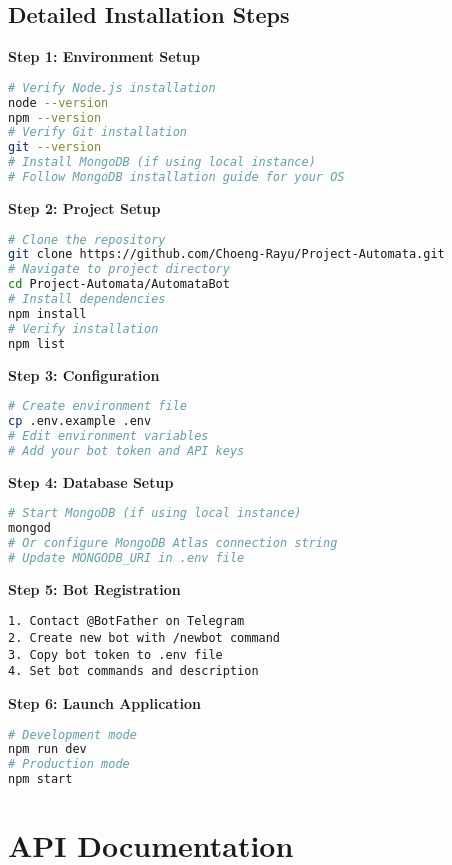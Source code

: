 \documentclass[12pt]{article}
\begin{document}
\subsection{Detailed Installation Steps}
\textbf{Step 1: Environment Setup}
\begin{lstlisting}[language=bash]
# Verify Node.js installation
node --version
npm --version
# Verify Git installation
git --version
# Install MongoDB (if using local instance)
# Follow MongoDB installation guide for your OS
\end{lstlisting}
\textbf{Step 2: Project Setup}
\begin{lstlisting}[language=bash]
# Clone the repository
git clone https://github.com/Choeng-Rayu/Project-Automata.git
# Navigate to project directory
cd Project-Automata/AutomataBot
# Install dependencies
npm install
# Verify installation
npm list
\end{lstlisting}
\textbf{Step 3: Configuration}
\begin{lstlisting}[language=bash]
# Create environment file
cp .env.example .env
# Edit environment variables
# Add your bot token and API keys
\end{lstlisting}
\textbf{Step 4: Database Setup}
\begin{lstlisting}[language=bash]
# Start MongoDB (if using local instance)
mongod
# Or configure MongoDB Atlas connection string
# Update MONGODB_URI in .env file
\end{lstlisting}
\textbf{Step 5: Bot Registration}
\begin{lstlisting}
1. Contact @BotFather on Telegram
2. Create new bot with /newbot command
3. Copy bot token to .env file
4. Set bot commands and description
\end{lstlisting}
\textbf{Step 6: Launch Application}
\begin{lstlisting}[language=bash]
# Development mode
npm run dev
# Production mode
npm start
\end{lstlisting}

\section{API Documentation}
\end{document}
